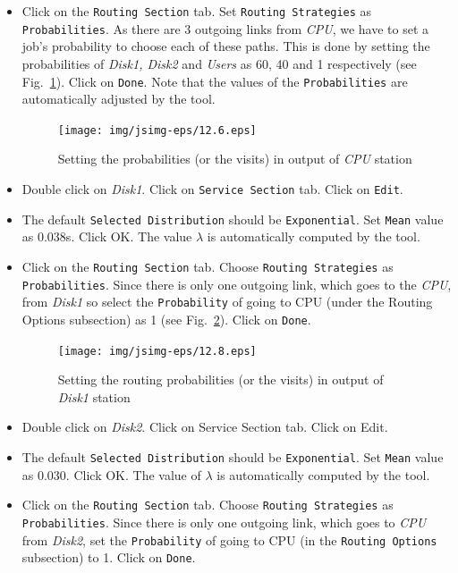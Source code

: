 \begin{itemize}
\item Click on the \texttt{Routing Section} tab. Set
\texttt{Routing Strategies} as \texttt{Probabilities}. As there
are 3 outgoing links from \emph{CPU}, we have to set a job's
probability to choose each of these paths. This is done by setting
the probabilities of \emph{Disk1, Disk2} and \emph{Users} as 60,
40 and 1 respectively (see Fig.~\ref{fig:probcpu}). Click on
\texttt{Done}. Note that the values of the \texttt{Probabilities}
are automatically adjusted by the tool.
\begin{figure}[htb]
    \begin{center}
        \texttt{[image: img/jsimg-eps/12.6.eps]}
    \end{center}
    \caption{Setting the probabilities (or the visits) in output
    of  \emph{CPU} station}
    \label{fig:probcpu}
\end{figure}
\item Double click on \emph{Disk1}. Click on \texttt{Service
Section} tab. Click on \texttt{Edit}. \item The default
\texttt{Selected Distribution} should be \texttt{Exponential}. Set
\texttt{Mean} value as 0.038s. Click OK. The value $\lambda$ is
automatically computed by the tool. \item Click on the
\texttt{Routing Section} tab. Choose \texttt{Routing Strategies}
as \texttt{Probabilities}. Since there is only one outgoing link,
which goes to the \emph{CPU}, from \emph{Disk1} so select the
\texttt{Probability} of going to CPU (under the Routing Options
subsection) as 1 (see Fig.~\ref{fig:probDisk1}). Click on
\texttt{Done}.
\begin{figure}[htb]
    \begin{center}
        \texttt{[image: img/jsimg-eps/12.8.eps]}
    \end{center}
    \caption{Setting the routing probabilities (or the visits) in output
    of \emph{Disk1} station}
    \label{fig:probDisk1}
\end{figure}
\item Double click on \emph{Disk2}. Click on Service Section tab.
Click on Edit. \item The default \texttt{Selected Distribution}
should be \texttt{Exponential}. Set \texttt{Mean} value as 0.030.
Click OK. The value of $\lambda$ is automatically computed by the
tool. \item Click on the \texttt{Routing Section} tab. Choose
\texttt{Routing Strategies} as \texttt{Probabilities}.  Since
there is only one outgoing link, which goes to \emph{CPU} from
\emph{Disk2}, set the \texttt{Probability} of going to CPU (in the
\texttt{Routing Options} subsection) to 1. Click on \texttt{Done}.
\end{itemize}

